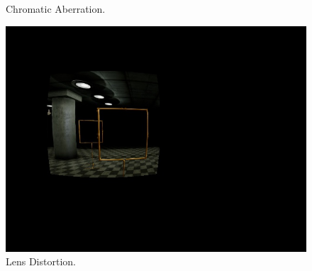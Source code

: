 \begin{figure}[htbp]
\begin{minipage}{0.33\textwidth}
		\caption{Chromatic Aberration.} 		
		\label{fig:chromatic}
	\end{minipage}
	\begin{minipage}{0.33\textwidth}
		\includegraphics[width=\textwidth]{fig/gate_example_distorted}
		\caption{Lens Distortion. }		
		\label{fig:distortion}
	\end{minipage}
	

\end{figure}
